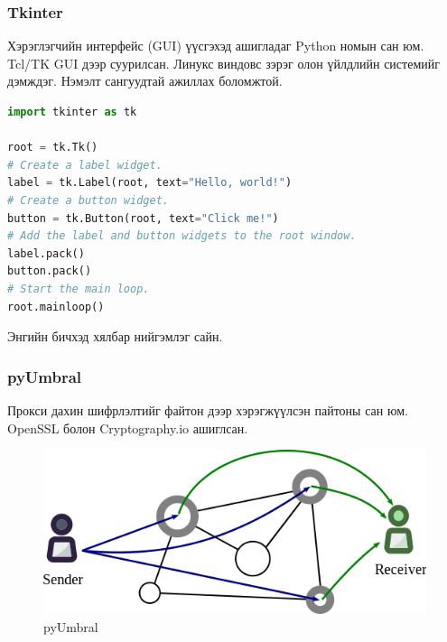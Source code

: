 \subsubsection*{\textbf{Tkinter}}
Хэрэглэгчийн интерфейс (GUI) үүсгэхэд ашигладаг Python номын сан юм. Tcl/TK GUI дээр суурилсан. Линукс виндовс зэрэг олон үйлдлийн системийг дэмждэг. Нэмэлт сангуудтай ажиллах боломжтой.
\begin{lstlisting}[language=Python]
import tkinter as tk

root = tk.Tk()
# Create a label widget.
label = tk.Label(root, text="Hello, world!")
# Create a button widget.
button = tk.Button(root, text="Click me!")
# Add the label and button widgets to the root window.
label.pack()
button.pack()
# Start the main loop.
root.mainloop()
\end{lstlisting}
Энгийн бичхэд хялбар нийгэмлэг сайн.
\subsubsection*{\textbf{pyUmbral}}
Прокси дахин шифрлэлтийг файтон дээр хэрэгжүүлсэн пайтоны сан юм. OpenSSL болон Cryptography.io ашиглсан.
\begin{figure}[ht]
    \centering
    \includegraphics[scale=0.5]{Figures/umbral.png}
    \caption[pyUmbral]{pyUmbral}
    \label{fig:pyUmbral}
\end{figure}


